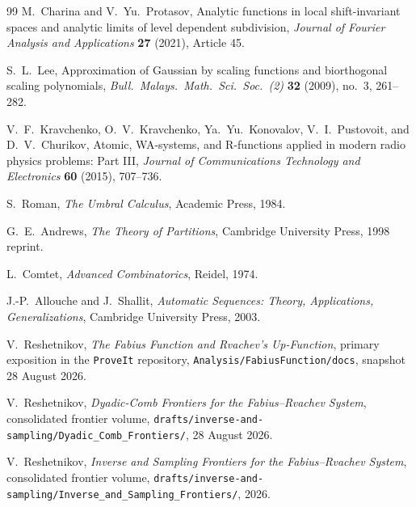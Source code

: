 \documentclass[11pt,oneside]{article}
\numberwithin{equation}{section}
\theoremstyle{definition}
\theoremstyle{remark}
\newcommand{\repo}{\nolinkurl{Analysis/FabiusFunction/docs}}
\begin{document}
\begin{thebibliography}{99}
M.~Charina and V.~Yu.~Protasov,
\newblock Analytic functions in local shift-invariant spaces and
analytic limits of level dependent subdivision,
\newblock \emph{Journal of Fourier Analysis and Applications}
\textbf{27} (2021), Article 45.

S.~L.~Lee,
\newblock Approximation of Gaussian by scaling functions and
biorthogonal scaling polynomials,
\newblock \emph{Bull.\ Malays.\ Math.\ Sci.\ Soc.\ (2)} \textbf{32}
(2009), no.~3, 261--282.

V.~F.~Kravchenko, O.~V.~Kravchenko, Ya.~Yu.~Konovalov,
V.~I.~Pustovoit, and D.~V.~Churikov,
\newblock Atomic, WA-systems, and R-functions applied in modern radio
physics problems: Part III,
\newblock \emph{Journal of Communications Technology and Electronics}
\textbf{60} (2015), 707--736.

S.~Roman,
\newblock \emph{The Umbral Calculus},
\newblock Academic Press, 1984.

G.~E.~Andrews,
\newblock \emph{The Theory of Partitions},
\newblock Cambridge University Press, 1998 reprint.

L.~Comtet,
\newblock \emph{Advanced Combinatorics},
\newblock Reidel, 1974.

J.-P.~Allouche and J.~Shallit,
\newblock \emph{Automatic Sequences: Theory, Applications,
Generalizations},
\newblock Cambridge University Press, 2003.

V.~Reshetnikov,
\newblock \emph{The Fabius Function and Rvachev's Up-Function},
\newblock primary exposition in the \texttt{ProveIt} repository,
\repo, snapshot 28 August 2026.

V.~Reshetnikov,
\newblock \emph{Dyadic-Comb Frontiers for the Fabius--Rvachev
System},
\newblock consolidated frontier volume,
\nolinkurl{drafts/inverse-and-sampling/Dyadic_Comb_Frontiers/},
28 August 2026.

V.~Reshetnikov,
\newblock \emph{Inverse and Sampling Frontiers for the
Fabius--Rvachev System},
\newblock consolidated frontier volume,
\nolinkurl{drafts/inverse-and-sampling/Inverse_and_Sampling_Frontiers/},
2026.

\end{thebibliography}
\end{document}

